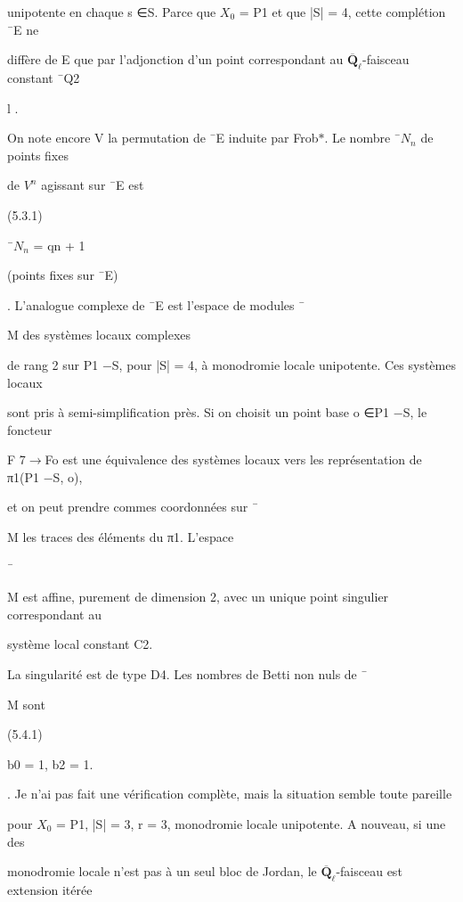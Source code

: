 \documentclass[11pt]{article}
\begin{document}
\noindent unipotente en chaque s ∈S. Parce que \(X_0\) = P1 et que |S| = 4, cette complétion ¯E ne\par
\noindent diffère de E que par l’adjonction d’un point correspondant au \(\overline{\mathbf Q}_{\ell}\)-faisceau constant ¯Q2\par
\noindent l .\par
\medskip
\noindent On note encore V la permutation de ¯E induite par Frob\(*\). Le nombre ¯\(N_n\) de points fixes\par
\noindent de \(V^n\) agissant sur ¯E est\par
\noindent (5.3.1)\par
\noindent ¯\(N_n\) = qn + 1\par
\noindent (points fixes sur ¯E)\par
{}. L’analogue complexe de ¯E est l’espace de modules ¯\par
\noindent M des systèmes locaux complexes\par
\noindent de rang 2 sur P1 −S, pour |S| = 4, à monodromie locale unipotente. Ces systèmes locaux\par
\noindent sont pris à semi-simplification près. Si on choisit un point base o ∈P1 −S, le foncteur\par
\noindent F 7\(\to\)Fo est une équivalence des systèmes locaux vers les représentation de π1(P1 −S, o),\par
\noindent et on peut prendre commes coordonnées sur ¯\par
\noindent M les traces des éléments du π1. L’espace\par
\noindent ¯\par
\noindent M est affine, purement de dimension 2, avec un unique point singulier correspondant au\par
\noindent système local constant C2.\par
\noindent La singularité est de type D4. Les nombres de Betti non nuls de ¯\par
\noindent M sont\par
\noindent (5.4.1)\par
\noindent b0 = 1, b2 = 1.\par
{}. Je n’ai pas fait une vérification complète, mais la situation semble toute pareille\par
\noindent pour \(X_0\) = P1, |S| = 3, r = 3, monodromie locale unipotente. A nouveau, si une des\par
\noindent monodromie locale n’est pas à un seul bloc de Jordan, le \(\overline{\mathbf Q}_{\ell}\)-faisceau est extension itérée\par
\end{document}
